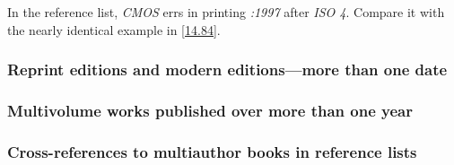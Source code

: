 \documentclass[11pt,letterpaper,oneside]{article}
\begin{document}
In the reference list, \textit{CMOS} errs in printing \textit{:1997}
after \textit{ISO 4}. Compare it with the nearly identical example in
\ref{14.84}.

\begin{citeref}
\item \parencite{iso1997.ref}
\end{citeref}

\setcounter{subsubsection}{39}
\subsubsection{Reprint editions and modern editions—more than one date}
\label{15.40}

\begin{citeref}
\item \parencite{austen2003}
\item \parencite{darwin1964}
\item \parencite{maitland1998}
\end{citeref}

\subsubsection{Multivolume works published over more than one year}
\label{15.41}

\begin{citeref}
\item \parencite[1:133]{tillich1951}
\item \parencite[329]{hayek2011}
\end{citeref}

\subsubsection{Cross-references to multiauthor books in reference lists}
\label{15.42}

\begin{citeref}
\item \parencite{draper1987}
\item \parencite{harrington1987}
\item \parencite{zukowsky1987}
\end{citeref}

\setcounter{subsubsection}{43}
\end{document}
